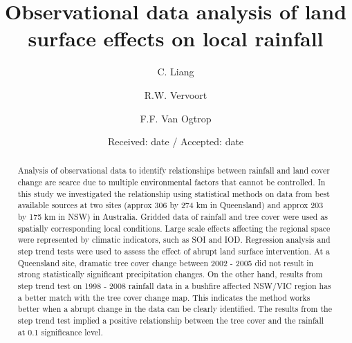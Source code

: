 \documentclass[onecolumn,referee]{svjour3}
\begin{document}


\title{Observational data analysis of land surface effects on local rainfall}

\author{C. Liang \and R.W. Vervoort \and F.F. Van Ogtrop}


\date{Received: date / Accepted: date}

\maketitle


\begin{abstract}
Analysis of observational data to identify relationships between rainfall and land cover change are scarce due to multiple environmental factors that cannot be controlled. In this study we investigated the relationship using statistical methods on data from best available sources at two sites (approx 306 by 274 km in Queensland) and approx 203 by 175 km in NSW) in Australia. Gridded data of rainfall and tree cover were used as spatially corresponding local conditions. Large scale effects affecting the regional space were represented by climatic indicators, such as SOI and IOD. Regression analysis and step trend tests were used to assess the effect of abrupt land surface intervention. At a Queensland site, dramatic tree cover change between 2002 - 2005 did not result in strong statistically significant precipitation changes. On the other hand, results from step trend test on 1998 - 2008 rainfall data in a bushfire affected NSW/VIC region has a better match with the tree cover change map. This indicates the method works better when a abrupt change in the data can be clearly identified. The results from the step trend test implied a positive relationship between the tree cover and the rainfall at 0.1 significance level. 
\end{abstract}
\end{document}
